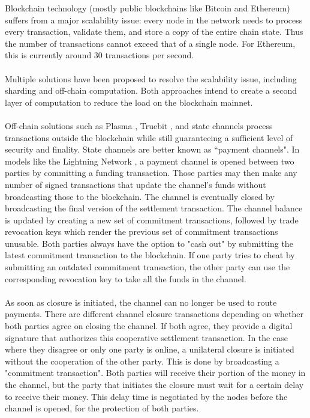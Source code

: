 Blockchain technology (mostly public blockchains like Bitcoin and Ethereum) suffers from a major scalability issue: every node in the network needs to process every transaction, validate them, and store a copy of the entire chain state. Thus the number of transactions cannot exceed that of a single node. For Ethereum, this is currently around 30 transactions per second.
\\~\\Multiple solutions have been proposed to resolve the scalability issue, including sharding and off-chain computation. Both approaches intend to create a second layer of computation to reduce the load on the blockchain mainnet.
\\~\\Off-chain solutions such as Plasma \cite{plasma}, Truebit \cite{truebit}, and state channels process transactions outside the blockchain while still guaranteeing a sufficient level of security and finality. State channels are better known as ``payment channels". In models like the Lightning Network \cite{lightningnetwork}, a payment channel is opened between two parties by committing a funding transaction. Those parties may then make any number of signed transactions that update the channel's funds without broadcasting those to the blockchain. The channel is eventually closed by broadcasting the final version of the settlement transaction.
The channel balance is updated by creating a new set of commitment transactions, followed by trade revocation keys which render the previous set of commitment transactions unusable. Both parties always have the option to "cash out" by submitting the latest commitment transaction to the blockchain. If one party tries to cheat by submitting an outdated commitment transaction, the other party can use the corresponding revocation key to take all the funds in the channel.
\\~\\As soon as closure is initiated, the channel can no longer be used to route payments. There are different channel closure transactions depending on whether both parties agree on closing the channel. If both agree, they provide a digital signature that authorizes this cooperative settlement transaction. In the case where they disagree or only one party is online, a unilateral closure is initiated without the cooperation of the other party. This is done by broadcasting a "commitment transaction". Both parties will receive their portion of the money in the channel, but the party that initiates the closure must wait for a certain delay to receive their money. This delay time is negotiated by the nodes before the channel is opened, for the protection of both parties.
